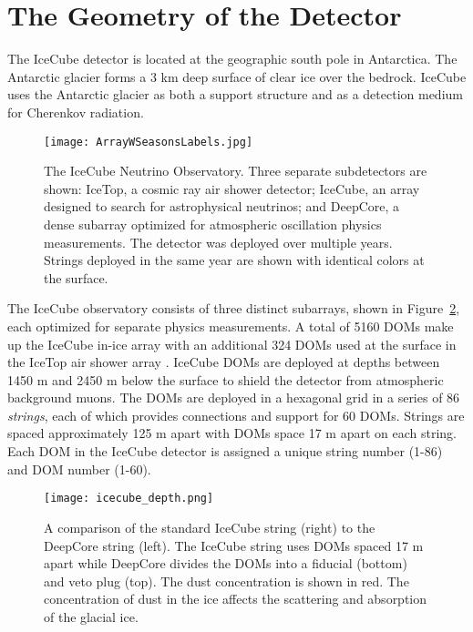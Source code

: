 \label{sec:geometry}
\section{The Geometry of the Detector}
The IceCube detector is located at the geographic south pole in Antarctica.
The Antarctic glacier forms a 3 km deep surface of clear ice over the bedrock.
IceCube uses the Antarctic glacier as both a support structure and as a detection medium for Cherenkov radiation.

\begin{figure}
\texttt{[image: ArrayWSeasonsLabels.jpg]}
\caption{The IceCube Neutrino Observatory. Three separate subdetectors are shown: IceTop, a cosmic ray air shower detector; IceCube, an array designed to search for astrophysical neutrinos; and DeepCore, a dense subarray optimized for atmospheric oscillation physics measurements. The detector was deployed over multiple years. Strings deployed in the same year are shown with identical colors at the surface. }
\label{fig:icecube_depth}
\end{figure}

The IceCube observatory consists of three distinct subarrays, shown in Figure~\ref{fig:icecube_depth}, each optimized for separate physics measurements.
A total of 5160 DOMs make up the IceCube in-ice array with an additional 324 DOMs used at the surface in the IceTop air shower array \cite{Description-IceCube}.
IceCube DOMs are deployed at depths between 1450 m and 2450 m below the surface to shield the detector from atmospheric background muons.
The DOMs are deployed in a hexagonal grid in a series of 86 \emph{strings}, each of which provides connections and support for 60 DOMs.
Strings are spaced approximately 125 m apart with DOMs space 17 m apart on each string.
Each DOM in the IceCube detector is assigned a unique string number (1-86) and DOM number (1-60).

\begin{figure}
\texttt{[image: icecube\_depth.png]}
\caption{A comparison of the standard IceCube string (right) to the DeepCore string (left). The IceCube string uses DOMs spaced 17 m apart while DeepCore divides the DOMs into a fiducial (bottom) and veto plug (top). The dust concentration is shown in red. The concentration of dust in the ice affects the scattering and absorption of the glacial ice.}
\label{fig:icecube_depth}
\end{figure}

